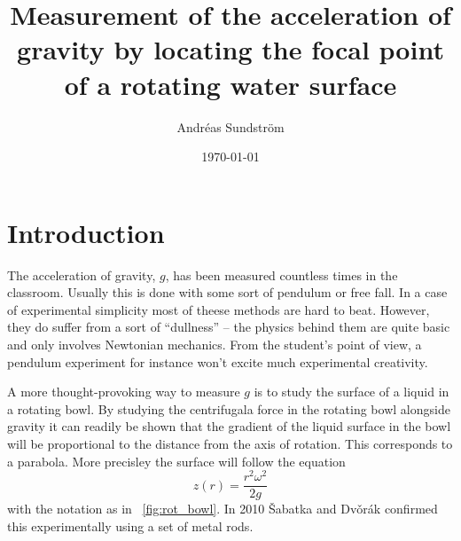 \documentclass[11pt,towcolumn, swedish, english]{article}
\newcommand{\figref}{\figurename~\ref}
\begin{document}
\title{Measurement of the acceleration of gravity by locating the
  focal point of a rotating water surface} 

\author{Andréas Sundström \footnotemark 
}
\date{\today}




\section{Introduction}
The acceleration of gravity, $g$, has been measured countless times in the
classroom. Usually this is done with some sort of pendulum or free fall. In a
case of experimental simplicity most of theese methods are hard to
beat. However, they do suffer from a sort of ``dullness'' -- the
physics behind them are quite basic and only involves Newtonian
mechanics. From the student's point of view, a pendulum experiment for
instance won't excite much experimental creativity. 

A more thought-provoking way to measure $g$ is to study the surface of a liquid
in a rotating bowl. By studying the centrifugala force in the rotating bowl
alongside gravity it can readily be shown that the gradient of the liquid surface in
the bowl will be proportional to the distance from the axis of rotation. This
corresponds to a parabola. More precisley the surface will follow the
equation \cite{Sabatka2010, Berg1990} 
\begin{equation}\label{eq:parabola}
z(r)=\frac{r^2\omega^2}{2g}
\end{equation}
with the notation as in \figref{fig:rot_bowl}. In 2010 \v{S}abatka and
Dv\v{o}rák \cite{Sabatka2010} confirmed this experimentally using a set of metal
rods. 
\end{document}
